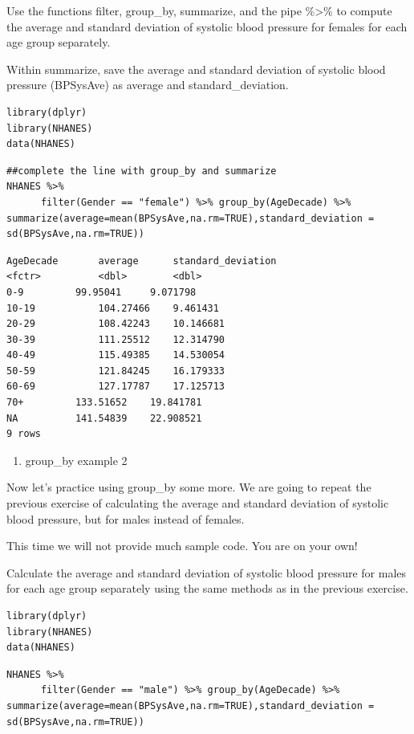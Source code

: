\documentclass[
]{article}
\providecommand{\tightlist}{%
  \setlength{\itemsep}{0pt}\setlength{\parskip}{0pt}}
\begin{document}
Use the functions filter, group\_by, summarize, and the pipe
\%\textgreater\% to compute the average and standard deviation of
systolic blood pressure for females for each age group separately.

Within summarize, save the average and standard deviation of systolic
blood pressure (BPSysAve) as average and standard\_deviation.

\begin{verbatim}
library(dplyr)
library(NHANES)
data(NHANES)
\end{verbatim}

\begin{verbatim}
##complete the line with group_by and summarize
NHANES %>%
      filter(Gender == "female") %>% group_by(AgeDecade) %>% summarize(average=mean(BPSysAve,na.rm=TRUE),standard_deviation = sd(BPSysAve,na.rm=TRUE))
\end{verbatim}

\begin{verbatim}
AgeDecade       average      standard_deviation
<fctr>          <dbl>        <dbl>
0-9         99.95041     9.071798
10-19           104.27466    9.461431
20-29           108.42243    10.146681
30-39           111.25512    12.314790
40-49           115.49385    14.530054
50-59           121.84245    16.179333
60-69           127.17787    17.125713
70+         133.51652    19.841781
NA          141.54839    22.908521
9 rows
\end{verbatim}

\begin{enumerate}
\def\labelenumi{\arabic{enumi}.}
\setcounter{enumi}{5}
\tightlist
\item
  group\_by example 2
\end{enumerate}

Now let's practice using group\_by some more. We are going to repeat the
previous exercise of calculating the average and standard deviation of
systolic blood pressure, but for males instead of females.

This time we will not provide much sample code. You are on your own!

Calculate the average and standard deviation of systolic blood pressure
for males for each age group separately using the same methods as in the
previous exercise.

\begin{verbatim}
library(dplyr)
library(NHANES)
data(NHANES)
\end{verbatim}

\begin{verbatim}
NHANES %>%
      filter(Gender == "male") %>% group_by(AgeDecade) %>% summarize(average=mean(BPSysAve,na.rm=TRUE),standard_deviation = sd(BPSysAve,na.rm=TRUE))
\end{verbatim}
\end{document}
